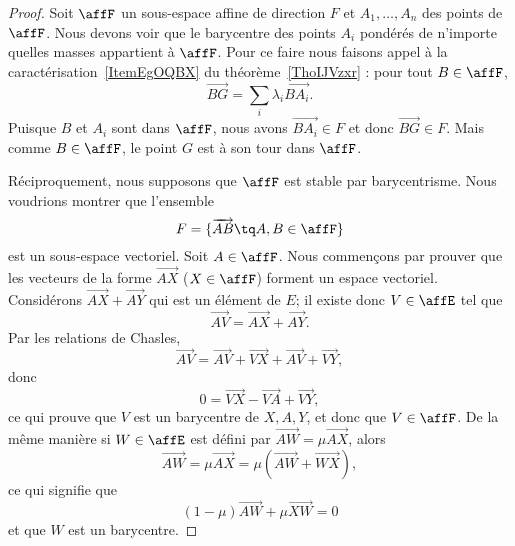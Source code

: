 \begin{proof}
	Soit \( \affF\) un sous-espace affine de direction \( F\) et \( A_1,\ldots, A_n\) des points de \( \affF\). Nous devons voir que le barycentre des points \( A_i\) pondérés de n'importe quelles masses appartient à \( \affF\). Pour ce faire nous faisons appel à la caractérisation~\ref{ItemEgOQBX} du théorème~\ref{ThoIJVzxr} : pour tout \( B\in\affF\),
	\begin{equation}
		\overrightarrow{ BG }=\sum_i\lambda_i\overrightarrow{ BA_i }.
	\end{equation}
	Puisque \( B\) et \( A_i\) sont dans \( \affF\), nous avons \( \overrightarrow{ BA_i }\in F\) et donc \( \overrightarrow{ BG }\in F\). Mais comme \( B\in\affF\), le point \( G\) est à son tour dans \( \affF\).

	Réciproquement, nous supposons que \( \affF\) est stable par barycentrisme. Nous voudrions montrer que l'ensemble
	\begin{equation}        \label{EqCmyWGi}
		F=\{ \overrightarrow{ AB }\tq A,B\in \affF \}
	\end{equation}
	est un sous-espace vectoriel. Soit \( A\in\affF\). Nous commençons par prouver que les vecteurs de la forme \( \overrightarrow{ AX }\) (\( X\in \affF\)) forment un espace vectoriel. Considérons \( \overrightarrow{ AX }+\overrightarrow{ AY }\) qui est un élément de \( E\); il existe donc \( V\in \affE\) tel que
	\begin{equation}
		\overrightarrow{ AV }=\overrightarrow{ AX }+\overrightarrow{ AY }.
	\end{equation}
	Par les relations de Chasles,
	\begin{equation}
		\overrightarrow{ AV }=\overrightarrow{ AV }+\overrightarrow{ VX }+\overrightarrow{ AV }+\overrightarrow{ VY },
	\end{equation}
	donc
	\begin{equation}
		0=\overrightarrow{ VX }-\overrightarrow{ VA }+\overrightarrow{ VY },
	\end{equation}
	ce qui prouve que \( V\) est un barycentre de \( X,A,Y\), et donc que \( V\in\affF\). De la même manière si \( W\in \affE\) est défini par \( \overrightarrow{ AW }=\mu \overrightarrow{ AX }\), alors
	\begin{equation}
		\overrightarrow{ AW }=\mu\overrightarrow{ AX }=\mu(\overrightarrow{ AW }+\overrightarrow{ WX }),
	\end{equation}
	ce qui signifie que
	\begin{equation}
		(1-\mu)\overrightarrow{ AW }+\mu\overrightarrow{ XW }=0
	\end{equation}
	et que \( W\) est un barycentre.


\end{proof}
